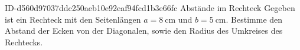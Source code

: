 \begin{exercise}
      {ID-d560d97037ddc250aeb10e92eaf94fcd1b3e66fc}
      {Abstände im Rechteck}
  \ifproblem\problem
    Gegeben ist ein Rechteck mit den Seitenlängen
    $a=\SI{8}{\centi\metre}$ und
    $b=\SI{5}{\centi\metre}$.
    Bestimme den Abstand der Ecken von der Diagonalen,
    sowie den Radius des Umkreises des Rechtecks.
  \fi
\end{exercise}
